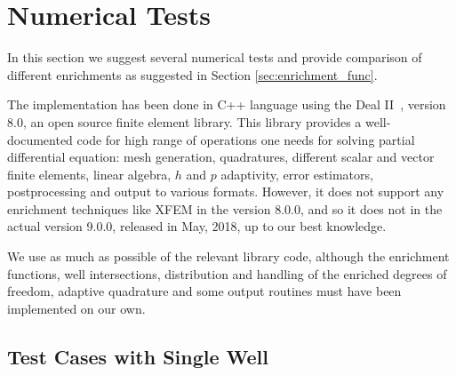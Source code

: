 \section{Numerical Tests}
\label{sec:pressure_results}

In this section we suggest several numerical tests and provide comparison of different enrichments
as suggested in Section \ref{sec:enrichment_func}.

The implementation has been done in C++ language using the Deal II~\cite{bangerth_deal.ii_2007}, version 8.0, 
an open source finite element library. This library provides a well-documented code for high range of operations one needs
for solving partial differential equation: mesh generation, quadratures, different scalar and vector finite elements,
linear algebra, $h$ and $p$ adaptivity, error estimators, postprocessing and output to various formats.
However, it does not support any enrichment techniques like XFEM in the version 8.0.0,
and so it does not in the actual version 9.0.0, released in May, 2018, up to our best knowledge.

We use as much as possible of the relevant library code, although the enrichment functions, well intersections,
distribution and handling of the enriched degrees of freedom, adaptive quadrature and some output routines
must have been implemented on our own.


\subsection{Test Cases with Single Well}
\label{sec:2d_results_single}



